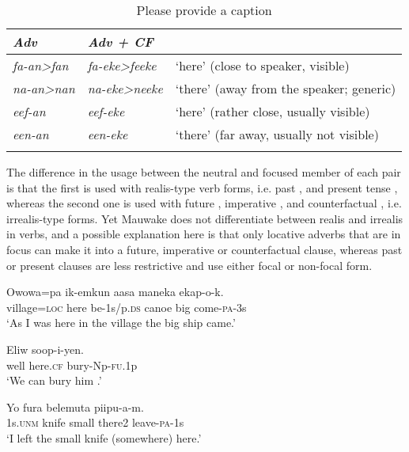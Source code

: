 \begin{table}
\caption{Please provide a caption}
 
\begin{tabular}{>{\itshape}l>{\itshape}ll}
\mytoprule
Adv &Adv + CF&\\
\midrule
fa-an{\textgreater}fan &fa-eke{\textgreater}feeke &`here' (close to speaker, visible) \\
na-an{\textgreater}nan &na-eke{\textgreater}neeke &`there' (away from the speaker; generic)\\
eef-an &eef-eke &`here' (rather close, usually visible)\\
een-an &een-eke &`there' (far away, usually not visible)\\
\mybottomrule
\end{tabular}
\end{table}


The difference in the usage between the neutral and focused member of each pair is that the first is  used with realis-type verb forms, i.e. past ,  and present tense , whereas the second one is  used with future , imperative , and counterfactual , i.e. irrealis-type forms. Yet Mauwake does not differentiate between realis and irrealis in verbs, and a possible explanation here is that only locative adverbs that are in focus can make it into a future, imperative or counterfactual clause, whereas past or present clauses are less restrictive and use either focal or non-focal form. 

\ea%
\label{ex:3:x463}
\gll Owowa=pa  ik-emkun aasa maneka ekap-o-k. \\
village=\textsc{loc} here be-1s/p.\textsc{ds} canoe big come-\textsc{pa}-3s\\
\glt`As I was here in the village the big ship came.'
\z

\ea%
\label{ex:3:x464}
\gll Eliw  soop-i-yen. \\
well here.\textsc{cf} bury-Np-\textsc{fu}.1p\\
\glt`We can bury him .'
\z

\ea%
\label{ex:3:x1213}
\gll Yo fura belemuta  piipu-a-m. \\
1s.\textsc{unm} knife small there2 leave-\textsc{pa}-1s\\
\glt`I left the small knife (somewhere) here.'
\z

